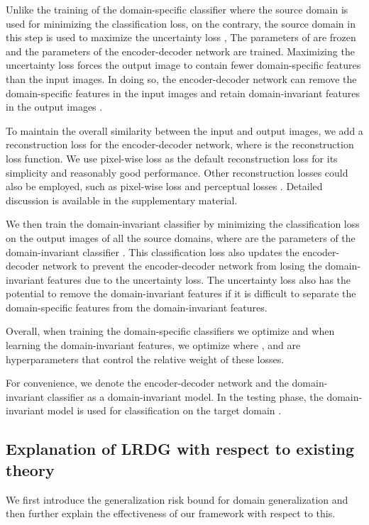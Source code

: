 \documentclass{article}
\begin{document}
Unlike the training of the domain-specific classifier  where the source domain  is used for minimizing the classification loss, on the contrary, the source domain  in this step is used to maximize the uncertainty loss , The parameters  of  are frozen and the parameters  of the encoder-decoder network  are trained. Maximizing the uncertainty loss forces the output image  to contain fewer domain-specific features than the input images. In doing so, the encoder-decoder network can remove the domain-specific features in the input images  and retain domain-invariant features in the output images . 

To maintain the overall similarity between the input and output images, we add a reconstruction loss  for the encoder-decoder network, where  is the reconstruction loss function. We use pixel-wise  loss as the default reconstruction loss for its simplicity and reasonably good performance. Other reconstruction losses could also be employed, such as pixel-wise  loss and perceptual losses \cite{johnson2016perceptual}. Detailed discussion is available in the supplementary material.

We then train the domain-invariant classifier  by minimizing the classification loss  on the output images of all the source domains, where  are the parameters of the domain-invariant classifier . This classification loss  also updates the encoder-decoder network to prevent the encoder-decoder network from losing the domain-invariant features due to the uncertainty loss. The uncertainty loss also has the potential to remove the domain-invariant features if it is difficult to separate the domain-specific features from the domain-invariant features.

Overall, when training the domain-specific classifiers we optimize and when learning the domain-invariant features, we optimize where ,  and  are hyperparameters that control the relative weight of these losses. 

For convenience, we denote the encoder-decoder network  and the domain-invariant classifier  as a domain-invariant model. In the testing phase, the domain-invariant model is used for classification on the target domain . 

\subsection{Explanation of LRDG with respect to existing theory}
\label{theory}

We first introduce the generalization risk bound for domain generalization \cite{albuquerque2019generalizing} and then further explain the effectiveness of our framework with respect to this.
\end{document}
